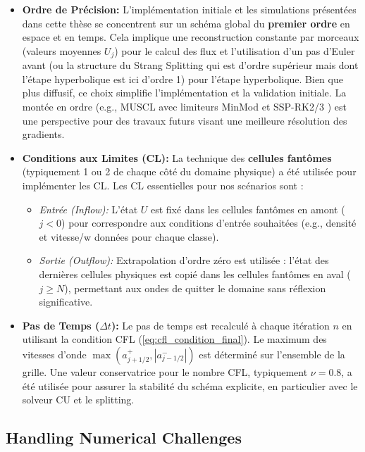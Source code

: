 \begin{itemize}
    \item \textbf{Ordre de Précision:} L'implémentation initiale et les simulations présentées dans cette thèse se concentrent sur un schéma global du \textbf{premier ordre} en espace et en temps. Cela implique une reconstruction constante par morceaux (valeurs moyennes \(U_j\)) pour le calcul des flux et l'utilisation d'un pas d'Euler avant (ou la structure du Strang Splitting qui est d'ordre supérieur mais dont l'étape hyperbolique est ici d'ordre 1) pour l'étape hyperbolique. Bien que plus diffusif, ce choix simplifie l'implémentation et la validation initiale. La montée en ordre (e.g., MUSCL \cite{vanLeer1979} avec limiteurs MinMod et SSP-RK2/3 \cite{GottliebShuTadmor2001}) est une perspective pour des travaux futurs visant une meilleure résolution des gradients.
    \item \textbf{Conditions aux Limites (CL):} La technique des \textbf{cellules fantômes} (typiquement 1 ou 2 de chaque côté du domaine physique) a été utilisée pour implémenter les CL. Les CL essentielles pour nos scénarios sont :
        \begin{itemize}
            \item \textit{Entrée (Inflow):} L'état \( U \) est fixé dans les cellules fantômes en amont (\(j < 0\)) pour correspondre aux conditions d'entrée souhaitées (e.g., densité et vitesse/w données pour chaque classe).
            \item \textit{Sortie (Outflow):} Extrapolation d'ordre zéro est utilisée : l'état des dernières cellules physiques est copié dans les cellules fantômes en aval (\(j \ge N\)), permettant aux ondes de quitter le domaine sans réflexion significative.
        \end{itemize}
    \item \textbf{Pas de Temps (\(\Delta t\)):} Le pas de temps est recalculé à chaque itération \( n \) en utilisant la condition CFL (\ref{eq:cfl_condition_final}). Le maximum des vitesses d'onde \( \max(a_{j+1/2}^+, |a_{j-1/2}^-|) \) est déterminé sur l'ensemble de la grille. Une valeur conservatrice pour le nombre CFL, typiquement \( \nu = 0.8 \), a été utilisée pour assurer la stabilité du schéma explicite, en particulier avec le solveur CU et le splitting.
\end{itemize}

\subsection{Handling Numerical Challenges}
\label{subsec:challenges}

